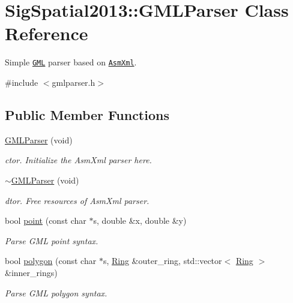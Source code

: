 \hypertarget{classSigSpatial2013_1_1GMLParser}{\section{Sig\-Spatial2013\-:\-:G\-M\-L\-Parser Class Reference}
\label{classSigSpatial2013_1_1GMLParser}
}


Simple \href{http://www.opengeospatial.org/standards/gml}{\tt G\-M\-L} parser based on \href{http://tibleiz.net/asm-xml/}{\tt Asm\-Xml}.  




{\ttfamily \#include $<$gmlparser.\-h$>$}

\subsection*{Public Member Functions}
\begin{DoxyCompactItemize}
\item 
\hypertarget{classSigSpatial2013_1_1GMLParser_a90ea2688da6f3ade2045bafea31a54e3}{\hyperlink{classSigSpatial2013_1_1GMLParser_a90ea2688da6f3ade2045bafea31a54e3}{G\-M\-L\-Parser} (void)}\label{classSigSpatial2013_1_1GMLParser_a90ea2688da6f3ade2045bafea31a54e3}

\begin{DoxyCompactList}\small\item\em ctor. Initialize the Asm\-Xml parser here. \end{DoxyCompactList}\item 
\hypertarget{classSigSpatial2013_1_1GMLParser_a3b8887ec6b57d30fb3382c0b6e1a8627}{\hyperlink{classSigSpatial2013_1_1GMLParser_a3b8887ec6b57d30fb3382c0b6e1a8627}{$\sim$\-G\-M\-L\-Parser} (void)}\label{classSigSpatial2013_1_1GMLParser_a3b8887ec6b57d30fb3382c0b6e1a8627}

\begin{DoxyCompactList}\small\item\em dtor. Free resources of Asm\-Xml parser. \end{DoxyCompactList}\item 
bool \hyperlink{classSigSpatial2013_1_1GMLParser_a4d8bb7775390292c88846443207c44a6}{point} (const char $\ast$s, double \&x, double \&y)
\begin{DoxyCompactList}\small\item\em Parse G\-M\-L point syntax. \end{DoxyCompactList}\item 
bool \hyperlink{classSigSpatial2013_1_1GMLParser_a44dc46fca44950badfad489e790060be}{polygon} (const char $\ast$s, \hyperlink{structSigSpatial2013_1_1Ring}{Ring} \&outer\-\_\-ring, std\-::vector$<$ \hyperlink{structSigSpatial2013_1_1Ring}{Ring} $>$ \&inner\-\_\-rings)
\begin{DoxyCompactList}\small\item\em Parse G\-M\-L polygon syntax. \end{DoxyCompactList}\end{DoxyCompactItemize}
